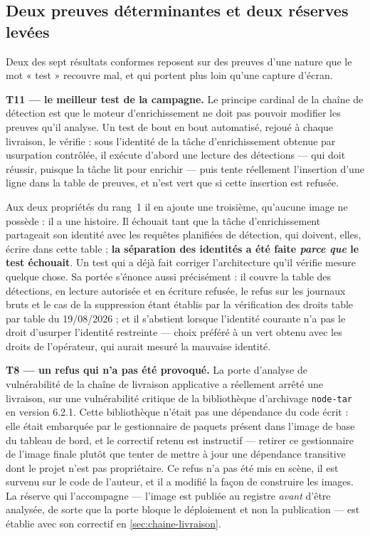 \subsection{Deux preuves déterminantes et deux réserves levées}
\label{sec:preuve-t11}

Deux des sept résultats conformes reposent sur des preuves d'une nature que le mot « test »
recouvre mal, et qui portent plus loin qu'une capture d'écran.

\textbf{T11 --- le meilleur test de la campagne.} Le principe cardinal de la chaîne de détection
est que le moteur d'enrichissement ne doit pas pouvoir modifier les preuves qu'il analyse. Un
test de bout en bout automatisé, rejoué à chaque livraison, le vérifie : sous l'identité de la
tâche d'enrichissement obtenue par usurpation contrôlée, il exécute d'abord une lecture des
détections --- qui doit réussir, puisque la tâche lit pour enrichir --- puis tente réellement
l'insertion d'une ligne dans la table de preuves, et n'est vert que si cette insertion est
refusée.

Aux deux propriétés du rang~1 il en ajoute une troisième, qu'aucune image ne possède : il a une
histoire. Il échouait tant que la tâche d'enrichissement partageait son identité avec les requêtes
planifiées de détection, qui doivent, elles, écrire dans cette table ; \textbf{la séparation des
identités a été faite \emph{parce que} le test échouait}. Un test qui a déjà fait corriger
l'architecture qu'il vérifie mesure quelque chose. Sa portée s'énonce aussi précisément : il couvre
la table des détections, en lecture autorisée et en écriture refusée, le refus sur les journaux
bruts et le cas de la suppression étant établis par la vérification des droits table par table du
19/08/2026 ; et il s'abstient lorsque l'identité courante n'a pas le droit d'usurper l'identité
restreinte --- choix préféré à un vert obtenu avec les droits de l'opérateur, qui aurait mesuré la
mauvaise identité.

\textbf{T8 --- un refus qui n'a pas été provoqué.} La porte d'analyse de vulnérabilité de la
chaîne de livraison applicative a réellement arrêté une livraison, sur une vulnérabilité critique
de la bibliothèque d'archivage \texttt{node-tar} en version 6.2.1. Cette bibliothèque n'était pas
une dépendance du code écrit : elle était embarquée par le gestionnaire de paquets présent dans
l'image de base du tableau de bord, et le correctif retenu est instructif --- retirer ce
gestionnaire de l'image finale plutôt que tenter de mettre à jour une dépendance transitive dont
le projet n'est pas propriétaire. Ce refus n'a pas été mis en scène, il est survenu sur le code
de l'auteur, et il a modifié la façon de construire les images. La réserve qui l'accompagne ---
l'image est publiée au registre \emph{avant} d'être analysée, de sorte que la porte bloque le
déploiement et non la publication --- est établie avec son correctif en
\cref{sec:chaine-livraison}.

